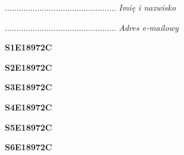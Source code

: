 \begin{turn}{90}\begin{minipage}{\linewidth} \vspace{20mm} ................................................  \textit{Imię i nazwisko}\end{minipage}\end{turn}

\begin{turn}{90}\begin{minipage}{\linewidth} \vspace{20mm} ................................................  \textit{Adres e-mailowy}\end{minipage}\end{turn}

\begin{turn}{90}\huge \begin{minipage}{\linewidth} \vspace{10mm}\textbf{S1E18972C}\end{minipage}\end{turn}

\begin{turn}{90}\huge \begin{minipage}{\linewidth} \vspace{10mm}\textbf{S2E18972C}\end{minipage}\end{turn}

\begin{turn}{90}\huge \begin{minipage}{\linewidth} \vspace{10mm}\textbf{S3E18972C}\end{minipage}\end{turn}

\begin{turn}{90}\huge \begin{minipage}{\linewidth} \vspace{10mm}\textbf{S4E18972C}\end{minipage}\end{turn}

\begin{turn}{90}\huge \begin{minipage}{\linewidth} \vspace{10mm}\textbf{S5E18972C}\end{minipage}\end{turn}

\begin{turn}{90}\huge \begin{minipage}{\linewidth} \vspace{10mm}\textbf{S6E18972C}\end{minipage}\end{turn}

